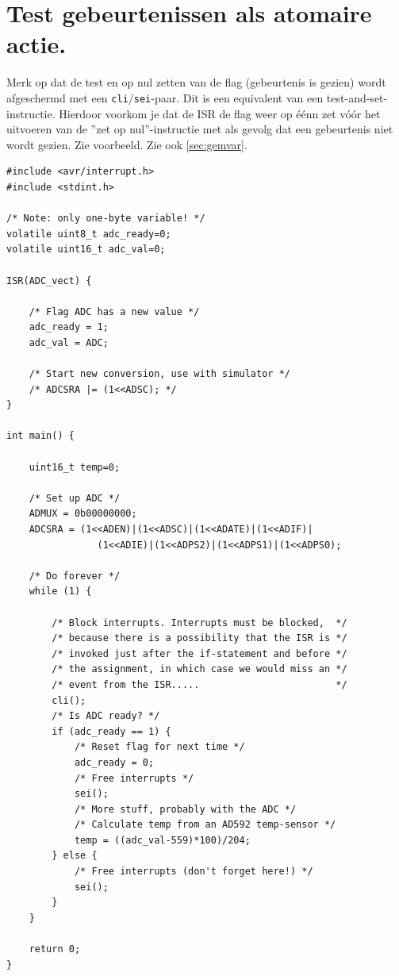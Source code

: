 \documentclass[12pt,a4paper,final,oneside,fleqn]{article}
\begin{document}
\section{Test gebeurtenissen als atomaire actie.}
\label{sec:atomair}
Merk op dat de test en op nul zetten van de flag (gebeurtenis is gezien) wordt afgeschermd
met een \texttt{cli}/\texttt{sei}-paar. Dit is een equivalent van een test-and-set-instructie.
Hierdoor voorkom je dat de ISR de flag weer op \'{e}\'{e}nn zet v\'{o}\'{o}r het uitvoeren van
de ''zet op nul''-instructie met als gevolg dat een gebeurtenis niet wordt gezien. Zie voorbeeld.
Zie ook \ref{sec:gemvar}.

\begin{lstlisting}[style=numbers,caption=Atomaire acties]
#include <avr/interrupt.h>
#include <stdint.h>

/* Note: only one-byte variable! */
volatile uint8_t adc_ready=0;
volatile uint16_t adc_val=0;

ISR(ADC_vect) {

	/* Flag ADC has a new value */
	adc_ready = 1;
    adc_val = ADC;

	/* Start new conversion, use with simulator */
	/* ADCSRA |= (1<<ADSC); */
}

int main() {

	uint16_t temp=0;

	/* Set up ADC */
	ADMUX = 0b00000000;
	ADCSRA = (1<<ADEN)|(1<<ADSC)|(1<<ADATE)|(1<<ADIF)|
	            (1<<ADIE)|(1<<ADPS2)|(1<<ADPS1)|(1<<ADPS0);

	/* Do forever */
	while (1) {

		/* Block interrupts. Interrupts must be blocked,  */
		/* because there is a possibility that the ISR is */
		/* invoked just after the if-statement and before */
		/* the assignment, in which case we would miss an */
		/* event from the ISR.....                        */
		cli();
		/* Is ADC ready? */
		if (adc_ready == 1) {
			/* Reset flag for next time */
			adc_ready = 0;
			/* Free interrupts */
			sei();
			/* More stuff, probably with the ADC */
			/* Calculate temp from an AD592 temp-sensor */
			temp = ((adc_val-559)*100)/204;
		} else {
			/* Free interrupts (don't forget here!) */
			sei();
		}
	}

	return 0;
}
\end{lstlisting}
\end{document}
